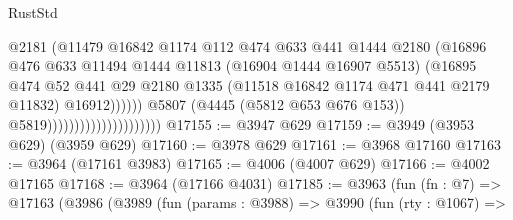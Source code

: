 \begin{lexlean}{RustStd}
\begin{coremodule}
{\begin{coremodule}
{{{{{{{{{{{{{{{{{{{{{{{{{{{{{{{{{{{{{{                                                    @2181
                                                    (@11479
                                                      @16842
                                                      @1174
                                                      @112
                                                      @474
                                                      @633
                                                      @441
                                                      @1444
                                                      @2180
                                                      (@16896
                                                        @476
                                                        @633
                                                        @11494
                                                        @1444
                                                        @11813
                                                        (@16904 @1444 @16907 @5513)
                                                        (@16895
                                                          @474
                                                          @52
                                                          @441
                                                          @29
                                                          @2180
                                                          @1335
                                                          (@11518
                                                            @16842
                                                            @1174
                                                            @471
                                                            @441
                                                            @2179
                                                            @11832)
                                                          @16912))))))
                                              @5807
                                              (@4445 (@5812 @653 @676 @153))
                                              @5819)))))))))))))))))))))
@17155 := @3947 @629
@17159 := @3949 (@3953 @629) (@3959 @629)
@17160 := @3978 @629
@17161 := @3968 @17160
@17163 := @3964 (@17161 @3983)
@17165 := @4006 (@4007 @629)
@17166 := @4002 @17165
@17168 := @3964 (@17166 @4031)
@17185 := @3963
    (fun (fn : @7) =>
    @17163
      (@3986
        (@3989
          (fun (params : @3988) =>
          @3990
            (fun (rty : @1067) =>
}}}}}}}}}}}}}}}}}}}}}}}}}}}}}}}}}}}}}}
\end{coremodule}}
\end{coremodule}
\end{lexlean}
